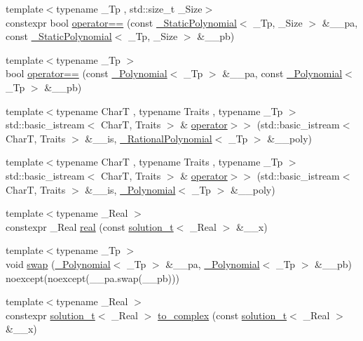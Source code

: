 \begin{DoxyCompactItemize}
\item 
{\footnotesize template$<$typename \+\_\+\+Tp , std\+::size\+\_\+t \+\_\+\+Size$>$ }\\constexpr bool \hyperlink{namespace____gnu__cxx_a4156deb610ec73be9e2f56a1a4caf391}{operator==} (const \hyperlink{class____gnu__cxx_1_1__StaticPolynomial}{\+\_\+\+Static\+Polynomial}$<$ \+\_\+\+Tp, \+\_\+\+Size $>$ \&\+\_\+\+\_\+pa, const \hyperlink{class____gnu__cxx_1_1__StaticPolynomial}{\+\_\+\+Static\+Polynomial}$<$ \+\_\+\+Tp, \+\_\+\+Size $>$ \&\+\_\+\+\_\+pb)
\item 
{\footnotesize template$<$typename \+\_\+\+Tp $>$ }\\bool \hyperlink{namespace____gnu__cxx_a7427db234bb8c8aab722a3196e898215}{operator==} (const \hyperlink{class____gnu__cxx_1_1__Polynomial}{\+\_\+\+Polynomial}$<$ \+\_\+\+Tp $>$ \&\+\_\+\+\_\+pa, const \hyperlink{class____gnu__cxx_1_1__Polynomial}{\+\_\+\+Polynomial}$<$ \+\_\+\+Tp $>$ \&\+\_\+\+\_\+pb)
\item 
{\footnotesize template$<$typename CharT , typename Traits , typename \+\_\+\+Tp $>$ }\\std\+::basic\+\_\+istream$<$ CharT, Traits $>$ \& \hyperlink{namespace____gnu__cxx_a71511bc907f332ce9bb925c953f11714}{operator$>$$>$} (std\+::basic\+\_\+istream$<$ CharT, Traits $>$ \&\+\_\+\+\_\+is, \hyperlink{class____gnu__cxx_1_1__RationalPolynomial}{\+\_\+\+Rational\+Polynomial}$<$ \+\_\+\+Tp $>$ \&\+\_\+\+\_\+poly)
\item 
{\footnotesize template$<$typename CharT , typename Traits , typename \+\_\+\+Tp $>$ }\\std\+::basic\+\_\+istream$<$ CharT, Traits $>$ \& \hyperlink{namespace____gnu__cxx_acf7d03318756578d08f672212cd91234}{operator$>$$>$} (std\+::basic\+\_\+istream$<$ CharT, Traits $>$ \&\+\_\+\+\_\+is, \hyperlink{class____gnu__cxx_1_1__Polynomial}{\+\_\+\+Polynomial}$<$ \+\_\+\+Tp $>$ \&\+\_\+\+\_\+poly)
\item 
{\footnotesize template$<$typename \+\_\+\+Real $>$ }\\constexpr \+\_\+\+Real \hyperlink{namespace____gnu__cxx_a2743043701f8e4c87d3f0f06ddb11348}{real} (const \hyperlink{namespace____gnu__cxx_ae20ea642de50eb361074c62676b0159c}{solution\+\_\+t}$<$ \+\_\+\+Real $>$ \&\+\_\+\+\_\+x)
\item 
{\footnotesize template$<$typename \+\_\+\+Tp $>$ }\\void \hyperlink{namespace____gnu__cxx_a10d002d78eb10d846416335ca9599c7a}{swap} (\hyperlink{class____gnu__cxx_1_1__Polynomial}{\+\_\+\+Polynomial}$<$ \+\_\+\+Tp $>$ \&\+\_\+\+\_\+pa, \hyperlink{class____gnu__cxx_1_1__Polynomial}{\+\_\+\+Polynomial}$<$ \+\_\+\+Tp $>$ \&\+\_\+\+\_\+pb) noexcept(noexcept(\+\_\+\+\_\+pa.\+swap(\+\_\+\+\_\+pb)))
\item 
{\footnotesize template$<$typename \+\_\+\+Real $>$ }\\constexpr \hyperlink{namespace____gnu__cxx_ae20ea642de50eb361074c62676b0159c}{solution\+\_\+t}$<$ \+\_\+\+Real $>$ \hyperlink{namespace____gnu__cxx_aa21adeccc5b87713003459ab7f08fc7b}{to\+\_\+complex} (const \hyperlink{namespace____gnu__cxx_ae20ea642de50eb361074c62676b0159c}{solution\+\_\+t}$<$ \+\_\+\+Real $>$ \&\+\_\+\+\_\+x)
\end{DoxyCompactItemize}
